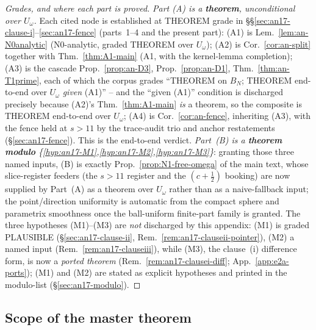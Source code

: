 \begin{proof}[Grades, and where each part is proved]
\emph{Part (A) is a \textbf{theorem}, unconditional over $U_\omega$.}
Each cited node is established at THEOREM grade in
\S\S\ref{sec:an17-clause-i}--\ref{sec:an17-fence} (parts~1--4 and the
present part): (A1) is Lem.~\ref{lem:an-N0analytic} (N0-analytic,
graded THEOREM over $U_\omega$); (A2) is Cor.~\ref{cor:an-split}
together with Thm.~\ref{thm:A1-main} (A1,
with the kernel-lemma completion); (A3)
is the cascade Prop.~\ref{prop:an-D3}, Prop.~\ref{prop:an-D1},
Thm.~\ref{thm:an-T1prime}, each of which the corpus grades ``THEOREM on
$B_N$; THEOREM end-to-end over $U_\omega$ \emph{given} (A1)'' -- and the
``given (A1)'' condition is discharged precisely because (A2)'s
Thm.~\ref{thm:A1-main} \emph{is} a theorem, so the composite is THEOREM
end-to-end over $U_\omega$; (A4) is Cor.~\ref{cor:an-fence}, inheriting
(A3), with the fence held at $s>11$ by the trace-audit trio and anchor
restatements (\S\ref{sec:an17-fence}).  This is the end-to-end
verdict.  \emph{Part~(B) is a \textbf{theorem modulo}
\{\ref{hyp:an17-M1},\ref{hyp:an17-M2},\ref{hyp:an17-M3}\}}: granting
those three named inputs, (B) is exactly Prop.~\ref{prop:N1-free-omega}
of the main text, whose slice-register feeders (the $s>11$ register and
the $(c+\tfrac12)$ booking) are now supplied by Part~(A) as a theorem
over $U_\omega$ rather than as a naive-fallback input; the
point/direction uniformity is automatic from the compact sphere and
parametrix smoothness once the ball-uniform finite-part family is
granted.  The three hypotheses (M1)--(M3) are \emph{not} discharged by
this appendix: (M1) is graded PLAUSIBLE (\S\ref{sec:an17-clause-ii},
Rem.~\ref{rem:an17-clauseii-pointer}), (M2) a named input
(Rem.~\ref{rem:an17-clauseiii}), while (M3), the clause~(i) difference
form, is now a \emph{ported theorem}
(Rem.~\ref{rem:an17-clausei-diff}; App.~\ref{app:e2a-ports}); (M1)
and (M2) are stated as explicit hypotheses and printed in the
modulo-list (\S\ref{sec:an17-modulo}).
\end{proof}

\subsection{Scope of the master theorem}
\label{sec:an17-scope}

